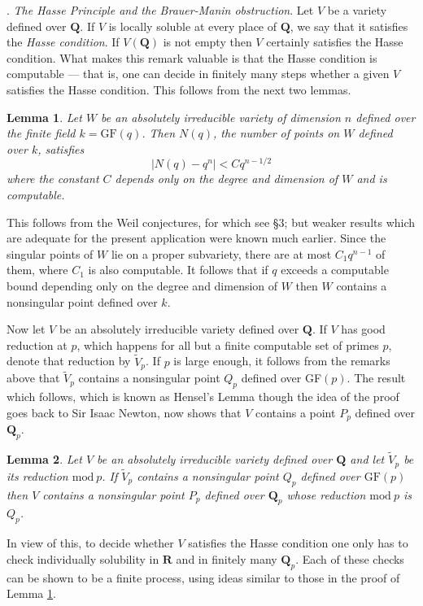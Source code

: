 \documentclass[12pt]{article}
\def\bQ{{\mathbf Q}}
\def\bR{{\mathbf R}}
\def\ble{\begin{lemma} \label}
\def\ele{\end{lemma}}
\newtheorem{lemma}{Lemma}
\begin{document}
\bigskip

. \emph{The Hasse Principle and the Brauer-Manin obstruction}.
\newline
Let $V$ be a variety defined over $\bQ$. If $V$ is locally soluble at every
place of $\bQ$, we say that it satisfies the \emph{Hasse
condition}. If $V(\bQ)$ is not empty then $V$ certainly satisfies
the Hasse condition. What makes this remark valuable is that the Hasse
condition is computable --- that is, one can decide in finitely many steps
whether a given $V$ satisfies the Hasse condition. This follows from the
next two lemmas.
\ble{L1} Let $W$ be an absolutely irreducible variety of dimension $n$ defined
over the finite field
$k={\mathrm{GF}}(q)$. Then $N(q)$, the number of points on $W$ defined over
$k$, satisfies
\[ |N(q)-q^n|<Cq^{n-1/2} \]
where the constant $C$ depends only on the degree and dimension of $W$ and is
computable.
\ele
This follows from the Weil conjectures, for which see \S3; but weaker results
which are adequate for the present application were known much earlier. Since
the singular points of $W$ lie on a proper subvariety, there are at most
$C_1q^{n-1}$ of them, where $C_1$ is also computable. It follows that if $q$
exceeds a computable bound depending only on the degree and dimension of $W$
then $W$ contains a nonsingular point defined over $k$.

Now let $V$ be an absolutely irreducible variety defined over $\bQ$. If $V$ has
good reduction at $p$, which happens for all but a finite computable set of
primes $p$, denote that reduction by $\tilde{V}_p$. If $p$ is large enough, it
follows from the remarks above that $\tilde{V}_p$ contains a nonsingular
point $Q_p$ defined over GF$(p)$. The result which follows, which is known as
Hensel's Lemma though the idea of the proof goes back to Sir Isaac Newton,
now shows that $V$ contains a point $P_p$ defined over $\bQ_p$.
\ble{L2} Let $V$ be an absolutely irreducible variety defined over $\bQ$ and
let $\tilde{V}_p$ be its reduction ${\mathrm{mod~}}p$. If $\tilde{V}_p$
contains a nonsingular point $Q_p$ defined over ${\mathrm{GF}}(p)$ then
$V$ contains a nonsingular point $P_p$ defined over $\bQ_p$ whose reduction
${\mathrm{mod~}}p$ is $Q_p$.
\ele
In view of this, to decide whether $V$ satisfies the Hasse condition one only
has to check individually solubility in $\bR$ and in finitely many $\bQ_p$.
Each of these checks can be shown to be a finite process,
using ideas similar to those in the proof of Lemma \ref{L1}.
\end{document}
